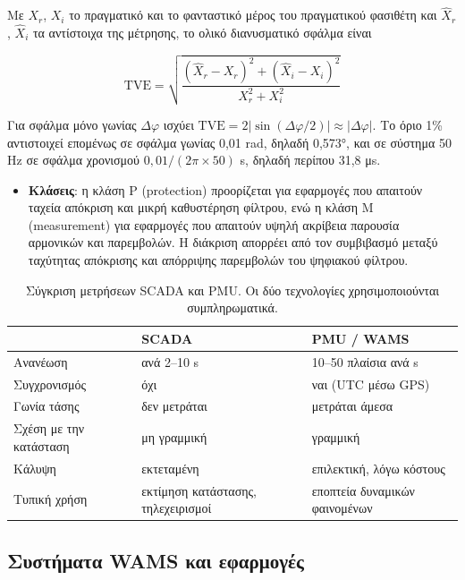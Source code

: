 Με $X_r$, $X_i$ το πραγματικό και το φανταστικό μέρος του πραγματικού φασιθέτη και
$\hat{X}_r$, $\hat{X}_i$ τα αντίστοιχα της μέτρησης, το ολικό διανυσματικό σφάλμα είναι

\begin{equation}
\mathrm{TVE} = \sqrt{\frac{(\hat{X}_r - X_r)^2 + (\hat{X}_i - X_i)^2}{X_r^2 + X_i^2}}
\label{eq:tve}
\end{equation}

Για σφάλμα μόνο γωνίας $\Delta\varphi$ ισχύει
$\mathrm{TVE} = 2\left|\sin(\Delta\varphi/2)\right| \approx |\Delta\varphi|$. Το όριο 1\%
αντιστοιχεί επομένως σε σφάλμα γωνίας 0,01 rad, δηλαδή 0,573°, και σε σύστημα 50 Hz σε σφάλμα
χρονισμού $0{,}01 / (2\pi \times 50)$ s, δηλαδή περίπου 31,8 μs.

\begin{itemize}
\item \textbf{Κλάσεις}: η κλάση P (protection) προορίζεται για εφαρμογές που απαιτούν ταχεία
      απόκριση και μικρή καθυστέρηση φίλτρου, ενώ η κλάση M (measurement) για εφαρμογές
      που απαιτούν υψηλή ακρίβεια παρουσία αρμονικών και παρεμβολών. Η διάκριση απορρέει
      από τον συμβιβασμό μεταξύ ταχύτητας απόκρισης και απόρριψης παρεμβολών του
      ψηφιακού φίλτρου.
\end{itemize}

\begin{table}[!htbp]
\centering
\begin{tabular}{lll}
\hline
 & SCADA & PMU / WAMS \\
\hline
Ανανέωση         & ανά 2--10 s        & 10--50 πλαίσια ανά s \\
Συγχρονισμός     & όχι                & ναι (UTC μέσω GPS) \\
Γωνία τάσης      & δεν μετράται       & μετράται άμεσα \\
Σχέση με την κατάσταση & μη γραμμική & γραμμική \\
Κάλυψη           & εκτεταμένη         & επιλεκτική, λόγω κόστους \\
Τυπική χρήση     & εκτίμηση κατάστασης, τηλεχειρισμοί & εποπτεία δυναμικών φαινομένων \\
\hline
\end{tabular}
\caption{Σύγκριση μετρήσεων SCADA και PMU. Οι δύο τεχνολογίες χρησιμοποιούνται
συμπληρωματικά.}
\label{tab:scada-pmu}
\end{table}

\subsection{Συστήματα WAMS και εφαρμογές}

